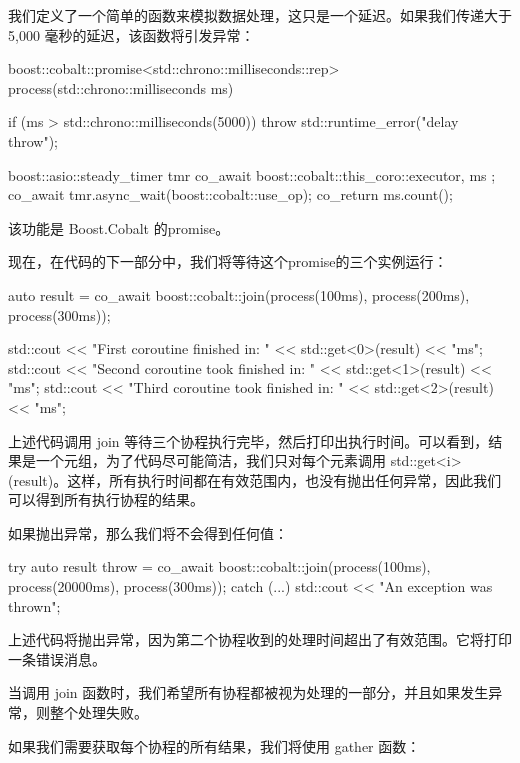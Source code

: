 我们定义了一个简单的函数来模拟数据处理，这只是一个延迟。如果我们传递大于 5,000 毫秒的延迟，该函数将引发异常：

\begin{cpp}
boost::cobalt::promise<std::chrono::milliseconds::rep>
process(std::chrono::milliseconds ms) {
    if (ms > std::chrono::milliseconds(5000)) {
        throw std::runtime_error("delay throw");
    }

    boost::asio::steady_timer tmr{ co_await boost::cobalt::this_coro::executor, ms };
    co_await tmr.async_wait(boost::cobalt::use_op);
    co_return ms.count();
}
\end{cpp}

该功能是 Boost.Cobalt 的promise。

现在，在代码的下一部分中，我们将等待这个promise的三个实例运行：

\begin{cpp}
auto result = co_await boost::cobalt::join(process(100ms),
                                           process(200ms),
                                           process(300ms));

std::cout << "First coroutine finished in: "
          << std::get<0>(result) << "ms\n";
std::cout << "Second coroutine took finished in: "
          << std::get<1>(result) << "ms\n";
std::cout << "Third coroutine took finished in: "
          << std::get<2>(result) << "ms\n";
\end{cpp}

上述代码调用 join 等待三个协程执行完毕，然后打印出执行时间。可以看到，结果是一个元组，为了代码尽可能简洁，我们只对每个元素调用 std::get<i>(result)。这样，所有执行时间都在有效范围内，也没有抛出任何异常，因此我们可以得到所有执行协程的结果。

如果抛出异常，那么我们将不会得到任何值：

\begin{cpp}
try {
    auto result throw = co_await
    boost::cobalt::join(process(100ms),
                        process(20000ms),
                        process(300ms));
}
catch (...) {
    std::cout << "An exception was thrown\n";
}
\end{cpp}

上述代码将抛出异常，因为第二个协程收到的处理时间超出了有效范围。它将打印一条错误消息。

当调用 join 函数时，我们希望所有协程都被视为处理的一部分，并且如果发生异常，则整个处理失败。

如果我们需要获取每个协程的所有结果，我们将使用 gather 函数：

